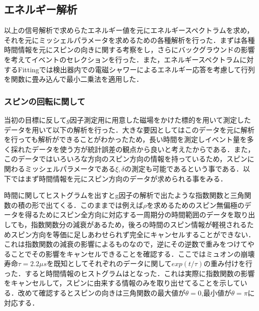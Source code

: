 %

\subsection{エネルギー解析}
以上の信号解析で求めらたエネルギー値を元にエネルギースペクトラムを求め，それを元にミッシェルパラメータを求めるための各種解析を行った．まずは各種時間情報を元にスピンの向きに関する考察をし，さらにバックグラウンドの影響を考えてイベントのセレクションを行った．また，エネルギースペクトラムに対するFittingでは検出器内での電磁シャワーによるエネルギー応答を考慮して行列を関数に畳み込んで最小二乗法を適用した．

\subsubsection{スピンの回転に関して}
当初の目標に反して$g$因子測定用に用意した磁場をかけた標的を用いて測定したデータを用いて以下の解析を行った．大きな要因としてはこのデータを元に解析を行っても解析ができることがわかったため，長い時間を測定しイベント量を多く採れたデータを使う方が統計誤差の観点から良いと考えたからである．また，このデータではいろいろな方向のスピン方向の情報を持っているため，スピンに関わるミッシェルパラメータである$\xi,\delta$の測定も可能であるという事である．以下ではまず時間情報を元にスピン方向のデータが求められる事をみる．

時間に関してヒストグラムを出すとg因子の解析で出たような指数関数と三角関数の積の形で出てくる．このままでは例えば$\rho$を求めるためのスピン無偏極のデータを得るためにスピン全方向に対応する一周期分の時間範囲のデータを取り出しても，指数関数分の減衰があるため，後ろの時間のスピン情報が軽視されるためスピン方向を等価に足しあわせられず完全にキャンセルすることができない．これは指数関数の減衰の影響によるものなので，逆にその逆数で重みをつけてやることでその影響をキャンセルできることを確認する．ここではミュオンの崩壊寿命$\tau=2.2\mu s$を既知としてそれぞれのデータに関して$exp(t/\tau)$の重み付けを行った．すると時間情報のヒストグラムはとなった．これは実際に指数関数の影響をキャンセルして，スピンに由来する情報のみを取り出せてることを示している．改めて確認するとスピンの向きは三角関数の最大値が$\theta=0$,最小値が$\theta=\pi$に対応する．

